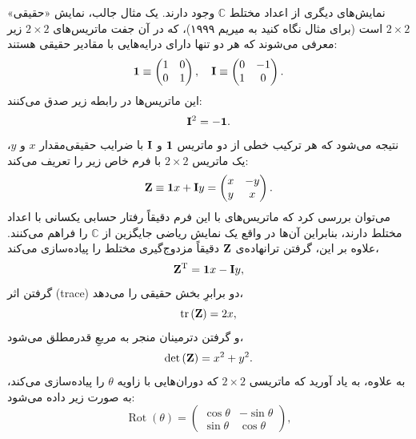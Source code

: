 \documentclass{article}
\begin{document}
نمایش‌های دیگری از اعداد مختلط $\mathbb{C}$ وجود دارند.
یک مثال جالب، نمایش «حقیقی» $2\times2$ است (برای مثال نگاه کنید به میریم ۱۹۹۹)\nocite{Myrheim:1999qmoarhs}،
که در آن جفت ماتریس‌های $2\times2$ زیر معرفی می‌شوند که هر دو تنها دارای درایه‌هایی با مقادیر حقیقی هستند:
\begin{equation}
\mathbf{1}\equiv\begin{pmatrix}1 & 0\\
0 & 1
\end{pmatrix},\quad\mathbf{I}\equiv\begin{pmatrix}0 & -1\\
1 & 0
\end{pmatrix}.\label{eq:Real2by2MatricesFor1Andi}
\end{equation}
 این ماتریس‌ها در رابطه زیر صدق می‌کنند:
\begin{equation}
\mathbf{I}^{2}=-\mathbf{1}.\label{eq:Real2by2iSqEqNegOne}
\end{equation}
 نتیجه می‌شود که هر ترکیب خطی از دو ماتریس $\mathbf{1}$ و $\mathbf{I}$ با ضرایب حقیقی‌مقدار $x$ و $y$، یک ماتریس $2\times2$ با فرم خاص زیر را تعریف می‌کند:
\begin{equation}
\mathbf{Z}\equiv\mathbf{1}x+\mathbf{I}y=\begin{pmatrix}x & -y\\
y & x
\end{pmatrix}.\label{eq:Real2by2ComplexNumberAsMatrix}
\end{equation}
 می‌توان بررسی کرد که ماتریس‌های با این فرم دقیقاً رفتار حسابی یکسانی با اعداد مختلط دارند، بنابراین آن‌ها در واقع یک نمایش ریاضی جایگزین از $\mathbb{C}$ را فراهم می‌کنند. علاوه بر این،
گرفتن ترانهاده‌ی $\mathbf{Z}$ دقیقاً مزدوج‌گیری مختلط را پیاده‌سازی می‌کند،
\begin{equation}
\mathbf{Z}^{\mathrm{T}}=\mathbf{1}x-\mathbf{I}y,\label{eq:Real2by2ComplexNumberTransposeAsConjugate}
\end{equation}
 گرفتن اثر (trace) دو برابرِ بخش حقیقی را می‌دهد،
\begin{equation}
\mathrm{tr}\left(\mathbf{Z}\right)=2x,\label{eq:Real2by2ComplexNumberTraceAsTwiceRealPart}
\end{equation}
 و گرفتن دترمینان منجر به مربعِ قدرمطلق می‌شود،
\begin{equation}
\det\left(\mathbf{Z}\right)=x^{2}+y^{2}.\label{eq:Real2by2ComplexNumberDeterminantAsModSquared}
\end{equation}
 به علاوه، به یاد آورید که ماتریسی $2\times2$ که دوران‌هایی با زاویه $\theta$ را پیاده‌سازی می‌کند، به صورت زیر داده می‌شود:
\begin{equation}
\operatorname{Rot}\left(\theta\right)=\begin{pmatrix}\cos\theta & -\sin\theta\\
\sin\theta & \cos\theta
\end{pmatrix},\label{eq:2by2RotationMatrix}
\end{equation}
\end{document}
